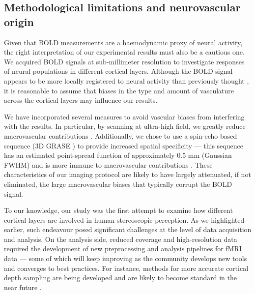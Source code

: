 \subsection{Methodological limitations and neurovascular origin}

Given that BOLD measurements are a haemodynamic proxy of neural activity, the right interpretation of our experimental results must also be a cautious one. We acquired BOLD signals at sub-millimeter resolution to investigate responses of neural populations in different cortical layers. Although the BOLD signal appears to be more locally registered to neural activity than previously thought \cite{Siero:2014it}, it is reasonable to assume that biases in the type and amount of vasculature across the cortical layers \cite{Duvernoy:1981yq} may influence our results.

We have incorporated several measures to avoid vascular biases from interfering with the results. In particular, by scanning at ultra-high field, we greatly reduce macrovascular contributions \cite{Gati:1997uq,Ogawa:1998fk,Ugurbil:2003uq}. Additionally, we chose to use a spin-echo based sequence (3D GRASE \cite{Feinberg:2008qa}) to provide increased spatial specificity --- this sequence has an estimated point-spread function of approximately 0.5 mm (Gaussian FWHM) and is more immune to macrovascular contributions \cite{DeMartino:2013qy}. These characteristics of our imaging protocol are likely to have largely attenuated, if not eliminated, the large macrovascular biases that typically corrupt the BOLD signal.

To our knowledge, our study was the first attempt to examine how different cortical layers are involved in human stereoscopic perception. As we highlighted earlier, such endeavour posed significant challenges at the level of data acquisition and analysis. On the analysis side, reduced coverage and high-resolution data required the development of new preprocessing and analysis pipelines for fMRI data --- some of which will keep improving as the community develops new tools and converges to best practices. For instance, methods for more accurate cortical depth sampling are being developed and are likely to become standard in the near future \cite{Waehnert:2013kl}.


